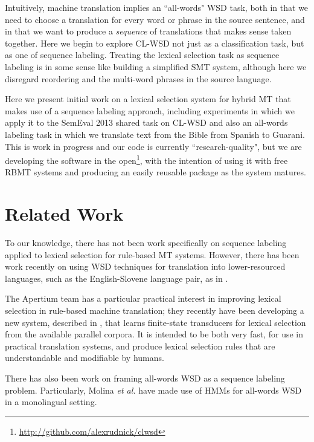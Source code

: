 \documentclass[11pt]{article}
\begin{document}
Intuitively, machine translation implies an ``all-words" WSD task, both in that
we need to choose a translation for every word or phrase in the source
sentence, and in that we want to produce a \emph{sequence} of translations that
makes sense taken together. Here we begin to explore CL-WSD not just
as a classification task, but as one of sequence labeling. Treating the lexical
selection task as sequence labeling is in some sense like building a simplified
SMT system, although here we disregard reordering and the multi-word phrases in
the source language.

Here we present initial work on a lexical selection system for hybrid MT that
makes use of a sequence labeling approach, including experiments in which we
apply it to the SemEval 2013 shared task on CL-WSD \cite{task10} and also an
all-words labeling task in which we translate text from the Bible from Spanish
to Guarani. This is work in progress and our code is currently
``research-quality", but we are developing the software in the
open\footnote{\url{http://github.com/alexrudnick/clwsd}}, with the intention of
using it with free RBMT systems and producing an easily reusable package as the
system matures.

\section{Related Work}
To our knowledge, there has not been work specifically on sequence labeling
applied to lexical selection for rule-based MT systems. However, 
there has been work recently on using WSD techniques for translation into
lower-resourced languages, such as the English-Slovene language pair, as in 
\cite{vintar-fivser-vrvsvcaj:2012:ESIRMT-HyTra2012}. 

The Apertium team has a particular practical interest in improving lexical
selection in rule-based machine translation; they recently have been developing
a new system, described in \cite{tyers-fst}, that learns finite-state
transducers for lexical selection from the available parallel corpora. It is
intended to be both very fast, for use in practical translation systems, and
produce lexical selection rules that are understandable and modifiable by
humans.

There has also been work on framing all-words WSD as a sequence labeling
problem. Particularly, Molina \textit{et al.}
 have made use of HMMs for all-words
WSD in a monolingual setting.
\end{document}
